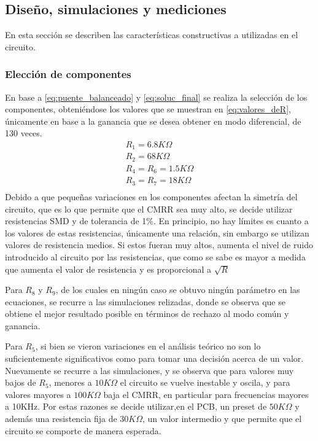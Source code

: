 \subsection{Dise\~no, simulaciones y mediciones}
En esta secci\'on se describen las caracter\'isticas constructivas a utilizadas en el circuito.

\subsubsection{Elecci\'on de componentes}
En base a \ref{eq:puente_balanceado} y \ref{eq:soluc_final} se realiza la selecci\'on de los componentes, obteni\'endose los valores que se muestran en \ref{eq:valores_deR}, \'unicamente en base a la ganancia que se desea obtener en modo diferencial, de 130 veces.
\begin{equation}
    \begin{array}{llll}
        R_1 = 6.8 K\Omega\\
        R_2 = 68 K\Omega\\
        R_4 = R_6 = 1.5 K\Omega\\
        R_3 = R_7 = 18 K\Omega \\
    \end{array}
\label{eq:valores_deR}    
\end{equation}
Debido a que peque\~nas variaciones en los componentes afectan la simetr\'ia del circuito, que es lo que permite que el CMRR sea muy alto, se decide utilizar resistencias SMD y de tolerancia de 1\%. 
En principio, no hay l\'imites es cuanto a los valores de estas resistencias, \'unicamente una relaci\'on, sin embargo se utilizan valores de resistencia medios. Si estos fueran muy altos, aumenta el nivel de ruido introducido al circuito por las resistencias, que como se sabe es mayor a medida que aumenta el valor de resistencia y es proporcional a $\sqrt{R}$

Para $R_8$ y $R_9$, de los cuales en ning\'un caso se obtuvo ning\'un par\'ametro en las ecuaciones, se recurre a las simulaciones relizadas, donde se observa que se obtiene el mejor resultado posible en t\'erminos de rechazo al modo com\'un y ganancia.

Para $R_5$, si bien se vieron variaciones en el an\'alisis te\'orico no son lo suficientemente significativos como para tomar una decisi\'on acerca de un valor. Nuevamente se recurre a las simulaciones, y se observa que para valores muy bajos de $R_5$, menores a $10 K\Omega$ el circuito se vuelve inestable y oscila, y para valores mayores a $100 K\Omega$ baja el CMRR, en particular para frecuencias mayores a 10KHz. Por estas razones se decide utilizar,en el PCB, un preset de $50 K\Omega$ y adem\'as una resistencia fija de $30 K\Omega$, un valor intermedio y que permite que el circuito se comporte de manera esperada. 


